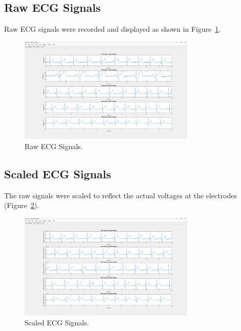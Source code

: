 \documentclass[11pt]{article}
\begin{document}
\subsection{Raw ECG Signals}
Raw ECG signals were recorded and displayed as shown in Figure~\ref{fig:rawsignals}.
\begin{figure}[H]
  \centering
  \includegraphics[width=0.75\textwidth]{photos/Figure_1_Raw_ECG_Signals.png}
  \caption{Raw ECG Signals.}
  \label{fig:rawsignals}
\end{figure}
\subsection{Scaled ECG Signals}
The raw signals were scaled to reflect the actual voltages at the electrodes (Figure~\ref{fig:scaledsignals}).
\begin{figure}[H]
  \centering
  \includegraphics[width=0.75\textwidth]{photos/Figure_2_Scaled_ECG_Signals.png}
  \caption{Scaled ECG Signals.}
  \label{fig:scaledsignals}
\end{figure}
\end{document}
